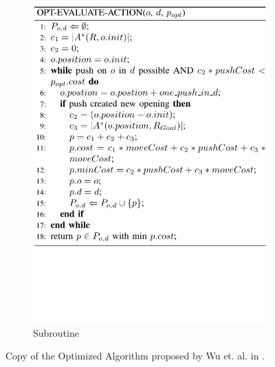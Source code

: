 \begin{figure}[H]
\begin{subfigure}{.45\textwidth}
  \centering
  \includegraphics[width=\linewidth]{Figures/Wu_Original_Algorithm/algo4.png}
  \caption{Subroutine}
  \label{fig:Wu_Original_Algorithm-algo4}
\end{subfigure}
\caption{Copy of the Optimized Algorithm proposed by Wu et. al. in \parencite{wu_navigation_2010}.}
\label{fig:Wu_Original_Algorithm-optimized}
\end{figure}

